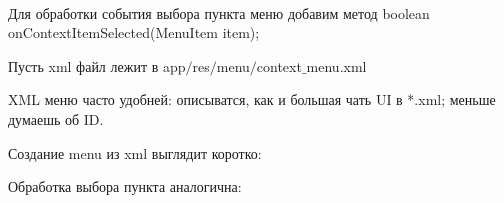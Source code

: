 
\\

    Для обработки события выбора пункта меню добавим метод
    boolean onContextItemSelected(MenuItem item);
 


    Пусть xml файл лежит в app$/$res$/$menu$/$context$\_$menu.xml


    XML меню часто удобней: описыватся, как и большая чать UI в *.xml; меньше думаешь об ID.

    Создание menu из xml выглядит коротко:


    Обработка выбора пункта аналогична:

